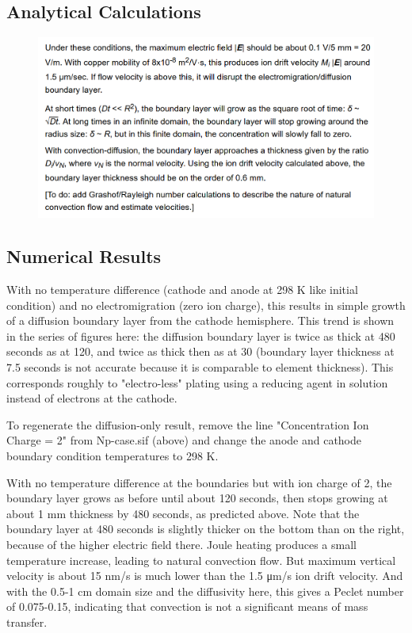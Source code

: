 \subsection{Analytical Calculations}

\begin{figure}[H]
\centering
\includegraphics[width=1.0\textwidth]{ec-25}
\end{figure}

\subsection{Numerical Results}

With no temperature difference (cathode and anode at 298 K like initial condition) and no electromigration (zero ion charge), this results in simple growth of a diffusion boundary layer from the cathode hemisphere. This trend is shown in the series of figures here: the diffusion boundary layer is twice as thick at 480 seconds as at 120, and twice as thick then as at 30 (boundary layer thickness at 7.5 seconds is not accurate because it is comparable to element thickness). This corresponds roughly to "electro-less" plating using a reducing agent in solution instead of electrons at the cathode.

To regenerate the diffusion-only result, remove the line "Concentration Ion Charge = 2" from Np-case.sif (above) and change the anode and cathode boundary condition temperatures to 298 K.

With no temperature difference at the boundaries but with ion charge of 2, the boundary layer grows as before until about 120 seconds, then stops growing at about 1 mm thickness by 480 seconds, as predicted above. Note that the boundary layer at 480 seconds is slightly thicker on the bottom than on the right, because of the higher electric field there. Joule heating produces a small temperature increase, leading to natural convection flow. But maximum vertical velocity is about 15 nm/s is much lower than the 1.5 μm/s ion drift velocity. And with the 0.5-1 cm domain size and the diffusivity here, this gives a Peclet number of 0.075-0.15, indicating that convection is not a significant means of mass transfer.

